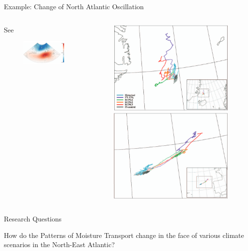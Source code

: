 \begin{frame}{Example: Change of North Atlantic Oscillation}

  \begin{columns}
    \begin{column}{.5 \textwidth}
    See \citeauthor{vietinghoff_visual_2021} \cite{vietinghoff_visual_2021}
    \begin{figure}[t]
      \centering
      \includegraphics[width=\columnwidth]{imglib/nao_eof_index.png}
    \end{figure}
      
    \end{column}
    \begin{column}{.5 \textwidth}
    \begin{figure}[t]
      \centering
      \includegraphics[width=.5 \columnwidth]{imglib/nao_mov_island.png}
      \includegraphics[width=.5 \columnwidth]{imglib/nao_mov_azore.png}
    \end{figure}
      
    \end{column}
    
  \end{columns}
  
\end{frame}


\begin{frame}{Research Questions}
  \begin{center}
    {\huge
      How do the Patterns of Moisture Transport change in the face of various climate scenarios in the North-East Atlantic?
    }
    
  \end{center}  

\end{frame}
